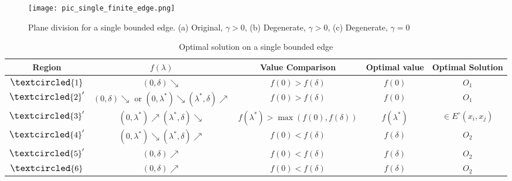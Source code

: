 \documentclass[final,3p,times]{elsarticle}
\begin{document}
\begin{figure}
  \centering
  \texttt{[image: pic\_single\_finite\_edge.png]}
  \caption{Plane division for a single bounded edge. (a) Original, $\gamma>0$, (b) Degenerate, $\gamma>0$, (c) Degenerate, $\gamma=0$}
  \label{pic_division_bounded}
\end{figure}

\begin{table}
  \caption{Optimal solution on a single bounded edge}
  \label{table_trend_bounded}
  \small
  \renewcommand{\arraystretch}{1.5}
  \centering
  \begin{tabular}{|*{5}{c|}}
  \hline
  Region & $f(\lambda)$ & Value Comparison & Optimal value & Optimal Solution \\ \hline
  $\large{\textcircled{\small{1}}}$   & $(0,\delta)\searrow$  & $f(0)>f(\delta)$ & $f(0)$ & $O_1$   \\ \hline
  $\large{\textcircled{\small{2}}}'$  & $(0,\delta)\searrow$ or $(0,\lambda^*)\searrow(\lambda^*,\delta)\nearrow$ & $f(0)>f(\delta)$ & $f(0)$ & $O_1$ \\ \hline
  $\large{\textcircled{\small{3}}}'$  & $(0,\lambda^*)\nearrow(\lambda^*,\delta)\searrow$ & $f(\lambda^*)>\max(f(0),f(\delta))$ & $f(\lambda^*)$ & $\in E^\circ(x_i,x_j)$ \\ \hline
  $\large{\textcircled{\small{4}}}'$  & $(0,\lambda^*)\searrow(\lambda^*,\delta)\nearrow$ & $f(0)<f(\delta)$ & $f(\delta)$ & $O_2$ \\ \hline
  $\large{\textcircled{\small{5}}}'$  & $(0,\delta)\nearrow$ & $f(0)<f(\delta)$ & $f(\delta)$  &$O_2$ \\ \hline
  $\large{\textcircled{\small{6}}}$   & $(0,\delta)\nearrow$ & $f(0)<f(\delta)$ & $f(\delta)$  &$O_2$ \\ \hline
  \end{tabular}
\end{table}
\end{document}
